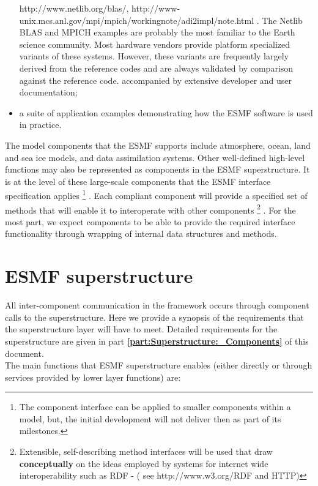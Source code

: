 \begin{itemize}
{http://www.netlib.org/blas/, http://www-unix.mcs.anl.gov/mpi/mpich/workingnote/adi2impl/note.html . The Netlib BLAS and MPICH
examples are probably the most familiar to the Earth science community. Most hardware vendors provide platform specialized variants
of these systems. However, these variants are frequently largely derived from the reference codes and are always validated by
comparison against the reference code.
}
  accompanied by extensive developer and user documentation;
\item a suite of application examples demonstrating how the ESMF
  software is used in practice.
\end{itemize}

The model components that the ESMF supports include atmosphere, ocean,
land and sea ice models, and data assimilation systems. Other
well-defined high-level functions may also be represented as
components in the ESMF superstructure.  It is at the level of these
large-scale components that the ESMF interface specification applies
\footnote{
The component interface can be applied to smaller components within a model,
but, the initial development will not deliver then as part of its milestones.
}
.
Each compliant component will provide a specified set of methods that
will enable it to interoperate with other components \footnote{
Extensible, self-describing method interfaces will be used that draw
{\bf conceptually} on the ideas employed by systems for internet
wide interoperability such as RDF - ( see http://www.w3.org/RDF and HTTP)
}
.  For the most
part, we expect components to be able to provide the required
interface functionality through wrapping of internal data structures
and methods. 

\section{ESMF superstructure}
\label{sec:ESMF_superstructure}

All inter-component communication in the framework occurs through 
component calls to the superstructure. Here we provide a synopsis of the
requirements that the superstructure layer will have to meet.
Detailed requirements for the superstructure are given in 
part {\bf \ref{part:Superstructure:_Components}} 
of this document. \\

\noindent The main functions that ESMF superstructure enables (either
directly or through services provided by lower layer functions) are:

